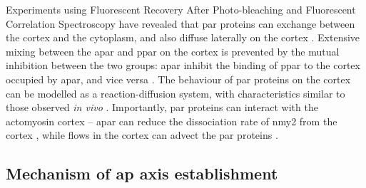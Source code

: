Experiments using Fluorescent Recovery After Photo-bleaching and Fluorescent Correlation Spectroscopy have revealed that \ac{par} proteins can exchange between the cortex and the cytoplasm, and also diffuse laterally on the cortex \citep{hoege2013principles,goehring2011proteins,schubert2000mex,petravsek2008characterization}. Extensive mixing between the \ac{apar} and \ac{ppar} on the cortex is prevented by the mutual inhibition between the two groups: \ac{apar} inhibit the binding of \ac{ppar} to the cortex occupied by \ac{apar}, and vice versa \citep{hoege2013principles,motegi2013network}. The behaviour of \ac{par} proteins on the cortex can be modelled as a reaction-diffusion system, with characteristics similar to those observed \emph{in vivo} \citep{hoege2013principles}. Importantly, \ac{par} proteins can interact with the actomyosin cortex -- \ac{apar} can reduce the dissociation rate of \ac{nmy2} from the cortex \citep{gross2019guiding}, while flows in the cortex can advect the \ac{par} proteins \citep{goehring2011advectionpolarization}. 

\subsection{Mechanism of \acs{ap} axis establishment}\label{subsec:mechanismApAxisEstablishment}

